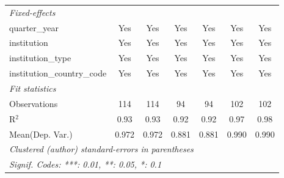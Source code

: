 \begin{tabular}{lcccccc}
   \emph{Fixed-effects}\\
   quarter\_year                      & Yes            & Yes            & Yes        & Yes        & Yes            & Yes\\  
   institution                        & Yes            & Yes            & Yes        & Yes        & Yes            & Yes\\  
   institution\_type                  & Yes            & Yes            & Yes        & Yes        & Yes            & Yes\\  
   institution\_country\_code         & Yes            & Yes            & Yes        & Yes        & Yes            & Yes\\  
   \midrule
   \emph{Fit statistics}\\
   Observations                       & 114            & 114            & 94         & 94         & 102            & 102\\  
   R$^2$                              & 0.93           & 0.93           & 0.92       & 0.92       & 0.97           & 0.98\\  
Mean(Dep. Var.) & 0.972 & 0.972 & 0.881 & 0.881 & 0.990 & 0.990 \\
   \midrule \midrule
   \multicolumn{7}{l}{\emph{Clustered (author) standard-errors in parentheses}}\\
   \multicolumn{7}{l}{\emph{Signif. Codes: ***: 0.01, **: 0.05, *: 0.1}}\\
\end{tabular}
\par\endgroup
